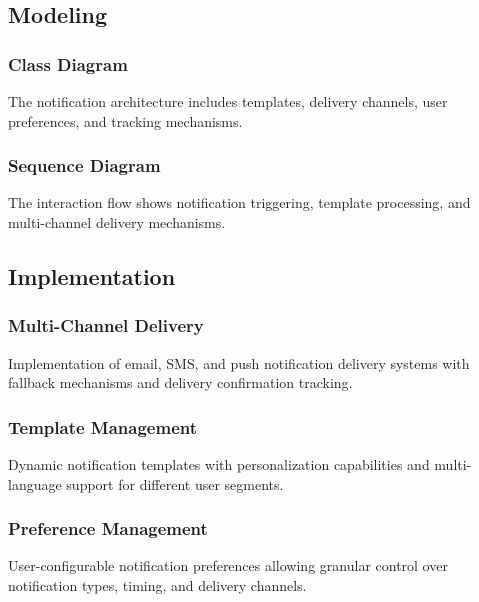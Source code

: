 \subsection{Modeling}
\subsubsection{Class Diagram}
The notification architecture includes templates, delivery channels, user preferences, and tracking mechanisms.


\subsubsection{Sequence Diagram}
The interaction flow shows notification triggering, template processing, and multi-channel delivery mechanisms.


\subsection{Implementation}
\subsubsection{Multi-Channel Delivery}
Implementation of email, SMS, and push notification delivery systems with fallback mechanisms and delivery confirmation tracking.

\subsubsection{Template Management}
Dynamic notification templates with personalization capabilities and multi-language support for different user segments.

\subsubsection{Preference Management}
User-configurable notification preferences allowing granular control over notification types, timing, and delivery channels.

